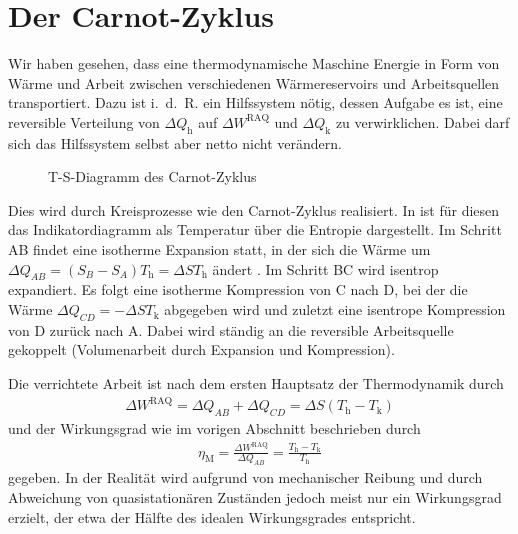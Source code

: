 \section{Der Carnot-Zyklus}

Wir haben gesehen, dass eine thermodynamische Maschine Energie in Form von Wärme und Arbeit zwischen verschiedenen Wärmereservoirs und Arbeitsquellen transportiert. Dazu ist i.~d.~R. ein Hilfssystem nötig, dessen Aufgabe es ist, eine reversible Verteilung von $\Delta Q_\mathrm{h}$ auf $\Delta W^\mathrm{RAQ}$ und $\Delta Q_\mathrm{k}$ zu verwirklichen. Dabei darf sich das Hilfssystem selbst aber netto nicht verändern. 

\begin{figure}[htbp]
    \centering
    \tfigCarnotCycleIndicatorDiagram
    \caption{T-S-Diagramm des Carnot-Zyklus}
    \label{fig:CarnotCycleIndicatorDiagram}
\end{figure}

Dies wird durch Kreisprozesse wie den Carnot-Zyklus realisiert. In  ist für diesen das Indikatordiagramm als Temperatur über die Entropie dargestellt. Im Schritt AB findet eine isotherme Expansion statt, in der sich die Wärme um $\Delta Q_{AB}=(S_B-S_A)T_\mathrm{h} = \Delta S T_\mathrm{h}$ ändert . Im Schritt BC wird isentrop expandiert. Es folgt eine isotherme Kompression von C nach D, bei der die Wärme $\Delta Q_{CD}=-\Delta S T_\mathrm{k}$ abgegeben wird und zuletzt eine isentrope Kompression von D zurück nach A. Dabei wird ständig an die reversible Arbeitsquelle gekoppelt (Volumenarbeit durch Expansion und Kompression). 

Die verrichtete Arbeit ist nach dem ersten Hauptsatz der Thermodynamik durch 
\begin{align*}
    \Delta W^\mathrm{RAQ}=\Delta Q_{AB}+\Delta Q_{CD} = \Delta S(T_\mathrm{h}-T_\mathrm{k})
\end{align*}
und der Wirkungsgrad wie im vorigen Abschnitt beschrieben durch 
\begin{align}
    \eta_\mathrm{M} = \frac{\Delta W^\mathrm{RAQ}}{\Delta Q_{AB}} = \frac{T_\mathrm{h}-T_\mathrm{k}}{T_\mathrm{h}}
\end{align}
gegeben. In der Realität wird aufgrund von mechanischer Reibung und durch Abweichung von quasistationären Zuständen jedoch meist nur ein Wirkungsgrad erzielt, der etwa der Hälfte des idealen Wirkungsgrades entspricht. 

